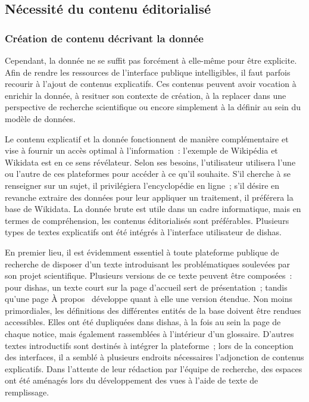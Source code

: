 \documentclass[a4paper,12pt,twoside]{book}
\newcommand{\g}[1]{\og#1~\fg}
\newcommand{\dishas}{\gls{dishas}\xspace}
\begin{document}
		\subsection{Nécessité du contenu éditorialisé}
			\subsubsection{Création de contenu décrivant la donnée}
Cependant, la donnée ne se suffit pas forcément à elle-même pour être explicite. Afin de rendre les ressources de l'interface publique intelligibles, il faut parfois recourir à l'ajout de contenus explicatifs. Ces contenus peuvent avoir vocation à enrichir la donnée, à resituer son contexte de création, à la replacer dans une perspective de recherche scientifique ou encore simplement à la définir au sein du modèle de données.

Le contenu explicatif et la donnée fonctionnent de manière complémentaire et vise à fournir un accès optimal à l'information~: l'exemple de Wikipédia et Wikidata est en ce sens révélateur. Selon ses besoins, l'utilisateur utilisera l'une ou l'autre de ces plateformes pour accéder à ce qu'il souhaite. S'il cherche à se renseigner sur un sujet, il privilégiera l'encyclopédie en ligne~; s'il désire en revanche extraire des données pour leur appliquer un traitement, il préférera la base de Wikidata. La donnée brute est utile dans un cadre informatique, mais en termes de compréhension, les contenus éditorialisés sont préférables. Plusieurs types de textes explicatifs ont été intégrés à l'interface utilisateur de \dishas.

En premier lieu, il est évidemment essentiel à toute plateforme publique de recherche de disposer d'un texte introduisant les problématiques soulevées par son projet scientifique. Plusieurs versions de ce texte peuvent être composées~: pour \dishas, un texte court sur la page d'accueil sert de présentation~; tandis qu'une page \g{À propos} développe quant à elle une version étendue. Non moins primordiales, les définitions des différentes entités de la base doivent être rendues accessibles. Elles ont été dupliquées dans \dishas, à la fois au sein la page de chaque notice, mais également rassemblées à l'intérieur d'un glossaire. D'autres textes introductifs sont destinés à intégrer la plateforme~; lors de la conception des interfaces, il a semblé à plusieurs endroits nécessaires l'adjonction de contenus explicatifs. Dans l'attente de leur rédaction par l'équipe de recherche, des espaces ont été aménagés lors du développement des vues à l'aide de texte de remplissage.
\end{document}
